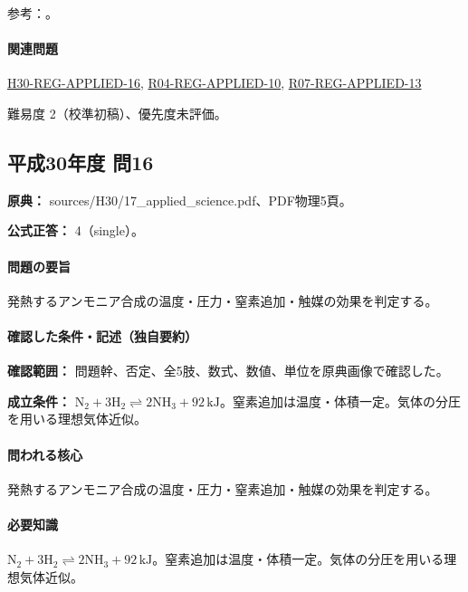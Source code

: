 \par 参考：\cite{iupac_greenbook2012}。

\paragraph{関連問題} \hyperref[q:h30-reg-applied-16]{H30-REG-APPLIED-16}, \hyperref[q:r04-reg-applied-10]{R04-REG-APPLIED-10}, \hyperref[q:r07-reg-applied-13]{R07-REG-APPLIED-13}

\par 難易度 2（校準初稿）、優先度未評価。

\subsection{平成30年度 問16}
\label{q:h30-reg-applied-16}

\noindent\textbf{原典：} sources/H30/17\_applied\_science.pdf、PDF物理5頁。

\textbf{公式正答：} 4（single）。

\paragraph{問題の要旨} 発熱するアンモニア合成の温度・圧力・窒素追加・触媒の効果を判定する。

\paragraph{確認した条件・記述（独自要約）}\mbox{}\par

\noindent\textbf{確認範囲：} 問題幹、否定、全5肢、数式、数値、単位を原典画像で確認した。\par

\noindent\textbf{成立条件：} \(\mathrm{N_2+3H_2\rightleftharpoons2NH_3}+92\,\mathrm{kJ}\)。窒素追加は温度・体積一定。気体の分圧を用いる理想気体近似。\par

\paragraph{問われる核心} 発熱するアンモニア合成の温度・圧力・窒素追加・触媒の効果を判定する。

\paragraph{必要知識} \(\mathrm{N_2+3H_2\rightleftharpoons2NH_3}+92\,\mathrm{kJ}\)。窒素追加は温度・体積一定。気体の分圧を用いる理想気体近似。

